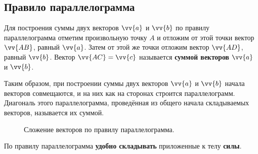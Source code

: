 \clearpage

\subsection{Правило параллелограмма}
Для построения суммы двух векторов $\vv{a}$ и $\vv{b}$
по правилу параллелограмма отметим произвольную точку $A$
и отложим от этой точки вектор $\vv{AB}$, равный $\vv{a}$.
Затем от этой же точки отложим вектор $\vv{AD}$, равный $\vv{b}$.
Вектор $\vv{AC}=\vv{c}$ называется \textbf{суммой векторов} $\vv{a}$ и $\vv{b}$.

Таким образом, при построении суммы двух векторов $\vv{a}$ и $\vv{b}$
начала векторов совмещаются,
и на них как на сторонах строится параллелограмм. Диагональ этого параллелограмма,
проведённая из общего начала складываемых векторов, называется их суммой.

\begin{figure}[h]
  \centering
  \caption{\small Сложение векторов по правилу параллелограмма.}\label{pic:sum_par}
\end{figure}

По правилу параллелограмма \textbf{удобно складывать}
приложенные к телу
\textbf{силы}.

